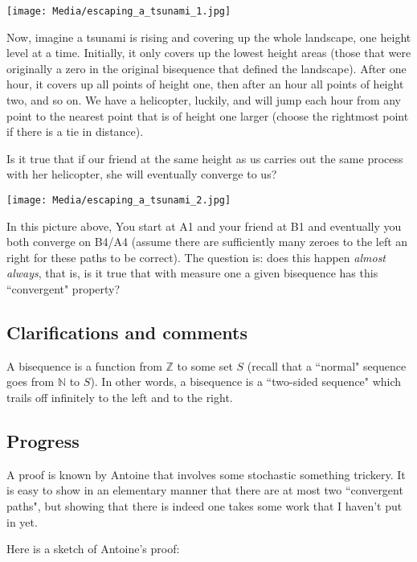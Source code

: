 \documentclass[10pt]{article}
\begin{document}
\texttt{[image: Media/escaping\_a\_tsunami\_1.jpg]}

Now, imagine a tsunami is rising and covering up the whole landscape, one height level at a time. Initially, it only covers up the lowest height areas (those that were originally a zero in the original bisequence that defined the landscape). After one hour, it covers up all points of height one, then after an hour all points of height two, and so on. We have a helicopter, luckily, and will jump each hour from any point to the nearest point that is of height one larger (choose the rightmost point if there is a tie in distance).

Is it true that if our friend at the same height as us carries out the same process with her helicopter, she will eventually converge to us?

\texttt{[image: Media/escaping\_a\_tsunami\_2.jpg]}

In this picture above, You start at A1 and your friend at B1 and eventually you both converge on B4/A4 (assume there are sufficiently many zeroes to the left an right for these paths to be correct). The question is: does this happen \textit{almost always}, that is, is it true that with measure one a given bisequence has this ``convergent" property?

\subsection{Clarifications and comments}

A bisequence is a function from $\mathbb{Z}$ to some set $S$ (recall that a ``normal" sequence goes from $\mathbb{N}$ to $S$). In other words, a bisequence is a ``two-sided sequence" which trails off infinitely to the left and to the right.

\subsection{Progress}

A proof is known by Antoine that involves some stochastic something trickery. It is easy to show in an elementary manner that there are at most two ``convergent paths", but showing that there is indeed one takes some work that I haven't put in yet.

Here is a sketch of Antoine's proof:
\end{document}
